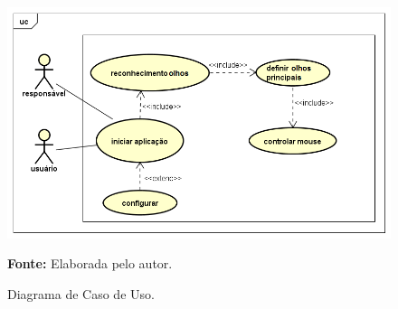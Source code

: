\begin{figure}[htbp]
\caption{Diagrama de Caso de Uso.}
\centering \includegraphics[scale=.6]{img/UseCase_Diagram_2.png}

{\fontsize{11}{11}\selectfont \textbf{Fonte:} Elaborada pelo autor.}
\label{fig:use-case-diagram}
\end{figure}





